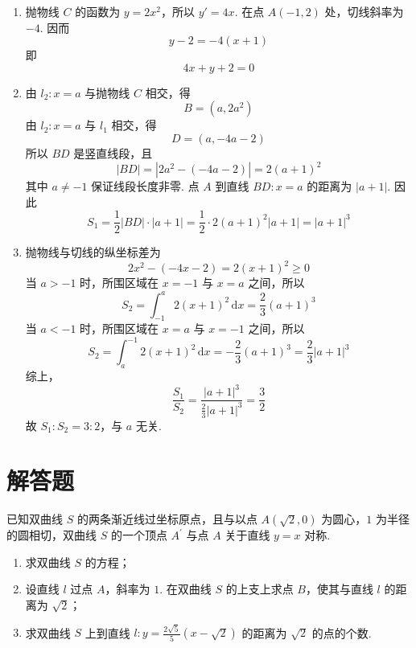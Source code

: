 \begin{solution}
\begin{enumerate}
\item 抛物线 \(C\) 的函数为 \(y=2x^2\)，所以
\(y'=4x\). 在点 \(A(-1,2)\) 处，切线斜率为 \(-4\). 因而
\[
y-2=-4(x+1)
\]
即
\[
4x+y+2=0
\]

\item 由 \(l_2:x=a\) 与抛物线 \(C\) 相交，得
\[
B=(a,2a^2)
\]
由 \(l_2:x=a\) 与 \(l_1\) 相交，得
\[
D=(a,-4a-2)
\]
所以 \(BD\) 是竖直线段，且
\[
|BD|=\left|2a^2-(-4a-2)\right|
=2(a+1)^2
\]
其中 \(a\neq-1\) 保证线段长度非零. 点 \(A\) 到直线 \(BD:x=a\) 的距离为
\(|a+1|\). 因此
\[
S_1=\frac{1}{2}|BD|\cdot|a+1|
=\frac{1}{2}\cdot2(a+1)^2|a+1|
=|a+1|^3
\]

\item 抛物线与切线的纵坐标差为
\[
2x^2-(-4x-2)=2(x+1)^2\geq0
\]
当 \(a>-1\) 时，所围区域在 \(x=-1\) 与 \(x=a\) 之间，所以
\[
S_2=\int_{-1}^{a}2(x+1)^2\,\mathrm{d}x
=\frac{2}{3}(a+1)^3
\]
当 \(a<-1\) 时，所围区域在 \(x=a\) 与 \(x=-1\) 之间，所以
\[
S_2=\int_{a}^{-1}2(x+1)^2\,\mathrm{d}x
=-\frac{2}{3}(a+1)^3
=\frac{2}{3}|a+1|^3
\]
综上，
\[
\frac{S_1}{S_2}
=\frac{|a+1|^3}{\frac{2}{3}|a+1|^3}
=\frac{3}{2}
\]
故 \(S_1:S_2=3:2\)，与 \(a\) 无关.
\end{enumerate}
\end{solution}

\section{解答题}

\begin{problem}
已知双曲线 \(S\) 的两条渐近线过坐标原点，且与以点 \(A(\sqrt{2},0)\) 为圆心，\(1\) 为半径的圆相切，双曲线 \(S\) 的一个顶点 \(A^\prime\) 与点 \(A\) 关于直线 \(y=x\) 对称.

\begin{enumerate}
\item 求双曲线 \(S\) 的方程；
\item 设直线 \(l\) 过点 \(A\)，斜率为 \(1\). 在双曲线 \(S\) 的上支上求点 \(B\)，使其与直线 \(l\) 的距离为 \(\sqrt{2}\)；
\item 求双曲线 \(S\) 上到直线 \(l:y=\frac{2\sqrt{5}}{5}\left(x-\sqrt{2}\right)\) 的距离为 \(\sqrt{2}\) 的点的个数.
\end{enumerate}

\end{problem}

